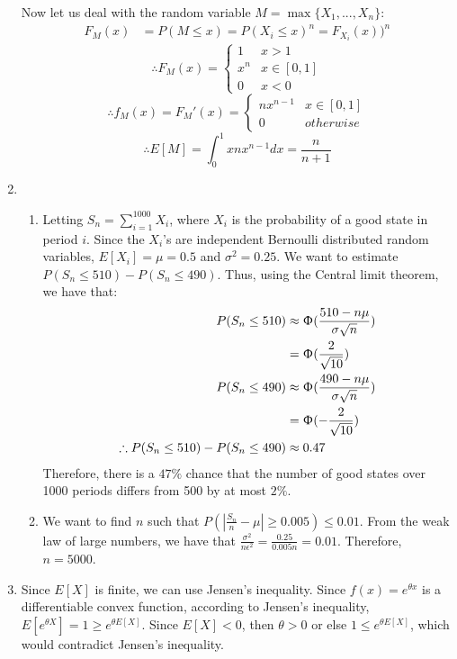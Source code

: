 \documentclass[letterpaper,12pt]{article}
\theoremstyle{definition}
\begin{document}
\begin{enumerate}
      Now let us deal with the random variable $M = \max{\{X_1,...,X_n\}}$:
        \begin{align*}
          F_M(x) &= P(M \leq x) = P(X_i \leq x)^n = F_{X_i}(x))^n
        \end{align*}
          \[
            \therefore F_M(x) =
            \begin{cases}
              1 & x > 1 \\
              x^n & x \in [0,1] \\
              0 & x < 0
            \end{cases}
          \]
          \[
            \therefore f_M(x) = F_M'(x) =
            \begin{cases}
              nx^{n-1} & x \in [0,1] \\
              0 & otherwise
            \end{cases}
          \]
        \begin{equation*}
          \therefore E[M] = \int_0^1 xnx^{n-1}dx = \frac{n}{n+1}
        \end{equation*}
  \item
    \begin{enumerate}
      \item
        Letting $S_n = \sum_{i=1}^{1000}X_i$, where $X_i$ is the probability of a good state in period $i$. Since the $X_i$'s are independent Bernoulli distributed random variables, $E[X_i] = \mu = 0.5$ and $\sigma^2 = 0.25$. We want to estimate $P(S_n \leq 510) - P(S_n \leq 490)$. Thus, using the Central limit theorem, we have that:
          \begin{align*}
            P(S_n \leq 510) & \approx \Upphi(\frac{510 - n\mu}{\sigma\sqrt{n}}) \\
            &= \Upphi(\frac{2}{\sqrt{10}}) \\
            P(S_n \leq 490) & \approx \Upphi(\frac{490 - n\mu}{\sigma\sqrt{n}}) \\
            &= \Upphi(-\frac{2}{\sqrt{10}}) \\
            \therefore P(S_n \leq 510) - P(S_n \leq 490) & \approx 0.47
          \end{align*}
        Therefore, there is a $47\%$ chance that the number of good states over 1000 periods differs from 500 by at most $2\%$.
      \item
        We want to find $n$ such that $P(|\frac{S_n}{n} - \mu| \geq 0.005) \leq 0.01$. From the weak law of large numbers, we have that $\frac{\sigma^2}{n\epsilon^2} = \frac{0.25}{0.005n} = 0.01$. Therefore, $n = 5000$.
    \end{enumerate}
  \item
  Since $E[X]$ is finite, we can use Jensen's inequality. Since $f(x) = e^{\theta x}$ is a differentiable convex function, according to Jensen's inequality, $E[e^{\theta X}] = 1 \geq e^{\theta E[X]}$. Since $E[X] < 0$, then $\theta > 0$ or else $1 \leq e^{\theta E[X]}$, which would contradict Jensen's inequality.

\end{enumerate}
\end{document}
